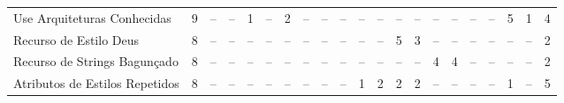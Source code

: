 \begin{table*}[t]
\begin{tabular}{@{}p{3.8cm}p{0.3cm}p{.2cm}p{.2cm}p{.2cm}p{.2cm}p{.2cm}p{.2cm}p{.2cm}p{.2cm}p{.2cm}p{.4cm}p{.4cm}p{.4cm}p{.4cm}p{.4cm}p{.4cm}p{.4cm}p{.4cm}p{.4cm}p{0.2cm}@{}}
Use Arquiteturas Conhecidas					& \multicolumn{1}{c}{9} 	& \multicolumn{1}{c}{--} 	& \multicolumn{1}{c}{--} 	& \multicolumn{1}{c}{1} 	& \multicolumn{1}{c}{--} 	& \multicolumn{1}{c}{2} 	& \multicolumn{1}{c}{--} 	& \multicolumn{1}{c}{--} 	& \multicolumn{1}{c}{--} 	& \multicolumn{1}{c}{--} 	& \multicolumn{1}{c}{--} 	& \multicolumn{1}{c}{--} 	& \multicolumn{1}{c}{--} 	& \multicolumn{1}{c}{--} 	& \multicolumn{1}{c}{--} 	& \multicolumn{1}{c}{--} 	& \multicolumn{1}{c}{--} 	& \multicolumn{1}{c}{5} 	& \multicolumn{1}{c}{1} 	& \multicolumn{1}{c}{4} \\
Recurso de Estilo Deus						& \multicolumn{1}{c}{8} 	& \multicolumn{1}{c}{--} 	& \multicolumn{1}{c}{--} 	& \multicolumn{1}{c}{--} 	& \multicolumn{1}{c}{--} 	& \multicolumn{1}{c}{--} 	& \multicolumn{1}{c}{--} 	& \multicolumn{1}{c}{--} 	& \multicolumn{1}{c}{--} 	& \multicolumn{1}{c}{--} 	& \multicolumn{1}{c}{--} 	& \multicolumn{1}{c}{5} 	& \multicolumn{1}{c}{3} 	& \multicolumn{1}{c}{--} 	& \multicolumn{1}{c}{--} 	& \multicolumn{1}{c}{--} 	& \multicolumn{1}{c}{--} 	& \multicolumn{1}{c}{--} 	& \multicolumn{1}{c}{--} 	& \multicolumn{1}{c}{2} \\
Recurso de Strings Bagun\c{c}ado			& \multicolumn{1}{c}{8} 	& \multicolumn{1}{c}{--} 	& \multicolumn{1}{c}{--} 	& \multicolumn{1}{c}{--} 	& \multicolumn{1}{c}{--} 	& \multicolumn{1}{c}{--} 	& \multicolumn{1}{c}{--} 	& \multicolumn{1}{c}{--} 	& \multicolumn{1}{c}{--} 	& \multicolumn{1}{c}{--} 	& \multicolumn{1}{c}{--} 	& \multicolumn{1}{c}{--} 	& \multicolumn{1}{c}{--} 	& \multicolumn{1}{c}{4} 	& \multicolumn{1}{c}{4} 	& \multicolumn{1}{c}{--} 	& \multicolumn{1}{c}{--} 	& \multicolumn{1}{c}{--} 	& \multicolumn{1}{c}{--} 	& \multicolumn{1}{c}{2} \\
Atributos de Estilos Repetidos				& \multicolumn{1}{c}{8} 	& \multicolumn{1}{c}{--} 	& \multicolumn{1}{c}{--} 	& \multicolumn{1}{c}{--} 	& \multicolumn{1}{c}{--} 	& \multicolumn{1}{c}{--} 	& \multicolumn{1}{c}{--} 	& \multicolumn{1}{c}{--} 	& \multicolumn{1}{c}{--} 	& \multicolumn{1}{c}{1} 	& \multicolumn{1}{c}{2} 	& \multicolumn{1}{c}{2} 	& \multicolumn{1}{c}{2} 	& \multicolumn{1}{c}{--} 	& \multicolumn{1}{c}{--} 	& \multicolumn{1}{c}{--} 	& \multicolumn{1}{c}{--} 	& \multicolumn{1}{c}{1} 	& \multicolumn{1}{c}{--} 	& \multicolumn{1}{c}{5} \\


\end{tabular}
\end{table*}
